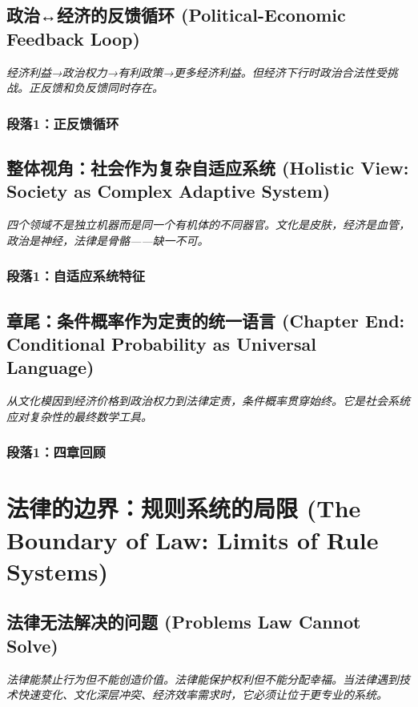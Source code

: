 \documentclass[a4paper,12pt]{book}
\newenvironment{motivation}{\begin{tcolorbox}[colback=gray!10,colframe=gray!60,title=\textit{动机}]\small\itshape}{\end{tcolorbox}}
\begin{document}
\begin{motivation}
\begin{motivation}
	\subsection{政治↔经济的反馈循环 (Political-Economic Feedback Loop)}
	\begin{motivation}经济利益→政治权力→有利政策→更多经济利益。但经济下行时政治合法性受挑战。正反馈和负反馈同时存在。
	\end{motivation}
	\subsubsection*{段落1：正反馈循环}

	\subsection{整体视角：社会作为复杂自适应系统 (Holistic View: Society as Complex Adaptive System)}
	\begin{motivation}
		四个领域不是独立机器而是同一个有机体的不同器官。文化是皮肤，经济是血管，政治是神经，法律是骨骼——缺一不可。\end{motivation}
	\subsubsection*{段落1：自适应系统特征}

	\subsection{章尾：条件概率作为定责的统一语言 (Chapter End: Conditional Probability as Universal Language)}
	\begin{motivation}从文化模因到经济价格到政治权力到法律定责，条件概率贯穿始终。它是社会系统应对复杂性的最终数学工具。
	\end{motivation}
	\subsubsection*{段落1：四章回顾}

	\section{法律的边界：规则系统的局限 (The Boundary of Law: Limits of Rule Systems)}

	\subsection{法律无法解决的问题 (Problems Law Cannot Solve)}
	\begin{motivation}
		法律能禁止行为但不能创造价值。法律能保护权利但不能分配幸福。当法律遇到技术快速变化、文化深层冲突、经济效率需求时，它必须让位于更专业的系统。
	\end{motivation}


\end{motivation}
\end{motivation}
\end{document}
